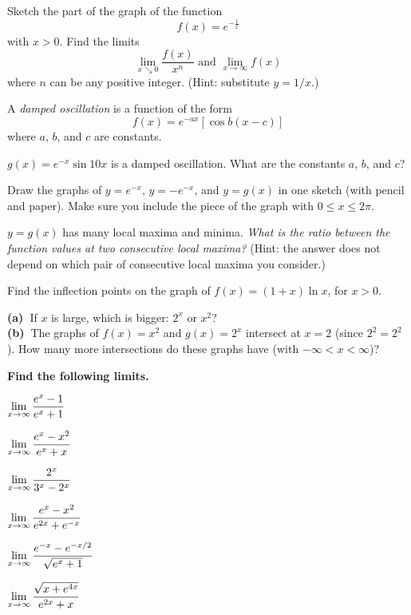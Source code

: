 \begin{multicols}{2}
\problem Sketch the part of the graph of the function %
\[
f(x) = e^{-\frac1x}
\]
with $x>0$.
Find the limits
\[
\lim_{x\searrow 0} \frac{f(x)}{x^n}
\text{ and }
\lim_{x \to\infty} f(x)
\]
where $n$ can be any positive integer. (Hint: substitute $y=1/x$.)

\problem A \emph{damped oscillation} is a function of the form %
\[
f(x) = e^{-ax} [\cos b(x-c)]
\]
where $a$, $b$, and $c$ are constants.

\subprob $g(x) = e^{-x} \sin 10x$ is a damped oscillation.  What are
the constants $a$, $b$, and $c$?

\subprob Draw the graphs of $y=e^{-x}$, $y=-e^{-x}$, and $y=g(x)$
in one sketch (with pencil and paper).  Make sure you include the
piece of the graph with $0\leq x\leq 2\pi$.

\subprob $y=g(x)$ has many local maxima and minima.  
\textit{What is the ratio between the function values at two consecutive
  local maxima?}  (Hint: the answer does not depend on which pair of
consecutive local maxima you consider.)


\problem Find the inflection points on the graph of $f(x) = (1+x)\ln x$, for $x>0$. %



\problem \textbf{(a)~}If $x$ is large, which is bigger: $2^x$ or $x^2$?\\ %
\textbf{(b)~}The graphs of $f(x) = x^2$ and $g(x) = 2^x$ intersect at $x=2$
(since $2^2=2^2$).  How many more intersections do these graphs have (with
$-\infty < x < \infty$)?




\bigskip
\textbf{Find the following limits.}
\begin{multicols}{2}
\problem  $\displaystyle\lim_{x\to\infty}\frac{e^x-1}{e^x+1} $ %




\problem  $\displaystyle\lim_{x \to\infty}\frac{e^x-x^2}{e^x+x} $ %




\problem  $\displaystyle\lim_{x\to\infty}\frac{2^x}{3^x-2^x} $ %




\problem  $\displaystyle\lim_{x \to\infty}\frac{e^x-x^2}{e^{2x}+e^{-x}} $ %




\problem  $\displaystyle\lim_{x \to\infty}\frac{e^{-x}-e^{-x/2}}{\sqrt{e^x+1}} $ %




\problem  $\displaystyle\lim_{x \to\infty}\frac{\sqrt{x+e^{4x}}}{e^{2x}+x} $ %





\end{multicols}
\end{multicols}
